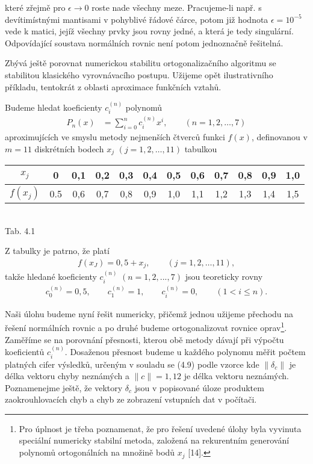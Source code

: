 \noindent
které  zřejmě pro $\epsilon \rightarrow 0$ roste nade všechny
meze. Pracujeme-li např. s devítimístnými mantisami v pohyblivé řádové
čárce, potom již hodnota $\epsilon = 10^{-5}$ vede k matici, jejíž
všechny prvky jsou rovny jedné, a která je tedy
singulární. Odpovídající soustava normálních rovnic není potom
jednoznačně řešitelná.


Zbývá ještě porovnat numerickou stabilitu ortogonalizačního algoritmu
se stabilitou klasického vyrovnávacího postupu.  Užijeme opět
ilustrativního příkladu, tentokrát z oblasti aproximace funkčních
vztahů.


Budeme hledat koeficienty $c_i^{(n)}$ polynomů
\begin{align*}
\tag{4.15}
P_n(x)&= \sum_{i=0}^n c_i^{(n)}x^i, \qquad(n=1,2,\ldots,7)
\end{align*}
%
aproximujících ve smyslu metody nejmenších čtverců funkci $f(x)$,
definovanou v $m=11$ diskrétních bodech $x_j$ $(j=1,2,\ldots,11)$
tabulkou
%
\begin{table}[h]
\centering
\begin{tabular}{|c|c|c|c|c|c|c|c|c|c|c|c|}
\hline
$x_j$    & 0   & 0,1 & 0,2 & 0,3 & 0,4 & 0,5 & 0,6 & 0,7 & 0,8 & 0,9 & 1,0\\
\hline
$f(x_j)$ & 0.5 & 0,6 & 0,7 & 0,8 & 0,9 & 1,0 & 1,1 & 1,2 & 1,3 & 1,4 & 1,5\\
\hline
\end{tabular}\\[1.5ex]
Tab. 4.1
\end{table}
%

\noindent
Z tabulky je patrno, že platí
%
\begin{align*}
\tag{4.16}   f(x_J) = 0,5 + x_j, \qquad (j=1,2,\ldots,11),
\end{align*}
%
takže hledané koeficienty $c_i^{(n)}$ $(n=1,2,...,7)$ jsou teoreticky
rovny
%
\begin{align*}
\tag{4.17}  c_0^{(n)} = 0,5, \qquad
            c_1^{(n)} = 1,   \qquad
            c_i^{(n)} = 0,   \qquad (1<i\le n).
\end{align*}
%





Naši úlohu budeme nyní řešit numericky, přičemž jednou
užijeme přechodu na řešení normálních rovnic a po druhé budeme
ortogonalizovat rovnice oprav\footnote{%
Pro úplnost je třeba poznamenat, že pro řešení uvedené úlohy
byla vyvinuta speciální numericky stabilní metoda, založená
na rekurentním generování polynomů ortogonálních na množině
bodů $x_j$ [14].
}.
%
Zaměříme se na porovnání
přesnosti, kterou obě metody dávají při výpočtu koeficientů
%
$c_i^{(n)}$.
%
Dosaženou přesnost budeme u každého polynomu měřit počtem
platných cifer výsledků, určeným v souladu se (4.9) podle vzorce
%
kde  $\|\delta_c\|$ je délka vektoru chyby neznámých a $\|c\|
= 1,12$ je délka vektoru neznámých. Poznamenejme ještě, že vektory
$\delta_c$ jsou v popisované úloze produktem zaokrouhlovacích chyb a
chyb ze zobrazení vstupních dat v počítači.



